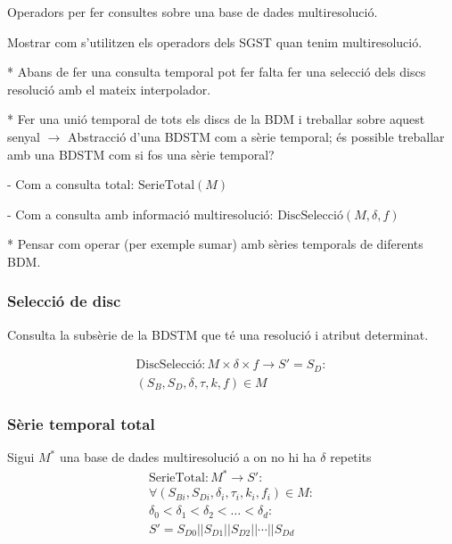 Operadors per fer consultes sobre una base de dades multiresolució. 

Mostrar com s'utilitzen els operadors dels SGST quan tenim multiresolució.


* Abans de fer una consulta temporal pot fer falta fer una selecció dels discs resolució amb el mateix interpolador.

* Fer una unió temporal de tots els discs de la BDM i treballar sobre aquest senyal $\longrightarrow$ Abstracció d'una BDSTM com a sèrie temporal; és possible treballar amb una BDSTM com si fos una sèrie temporal?

  - Com a consulta total: $\text{SerieTotal}(M)$

  - Com a consulta amb informació multiresolució: $\text{DiscSelecció}(M,\delta,f)$

* Pensar com operar (per exemple sumar) amb sèries temporals de diferents BDM. 




\subsubsection{Selecció de disc}


Consulta la subsèrie de la BDSTM que té una resolució i atribut
determinat. 


\begin{definition}[DiscSelecció]
  \begin{gather*}
    \text{DiscSelecció}: M \times \delta \times f \longrightarrow S' = S_D: \\
    (S_B,S_D,\delta,\tau,k,f) \in M
\end{gather*}
\end{definition}



\subsubsection{Sèrie temporal total}



\begin{definition}
  Sigui $M^*$ una base de dades multiresolució a on no hi ha $\delta$ repetits
  \begin{gather*}
    \text{SerieTotal}: M^* \longrightarrow S': \\
    \forall (S_{Bi},S_{Di},\delta_i,\tau_i,k_i,f_i) \in M : \\
    \delta_0 < \delta_1 < \delta_2 < \dots < \delta_d : \\
    S' = S_{D0} || S_{D1} || S_{D2} || \dotsb || S_{Dd}
\end{gather*}
\end{definition}

